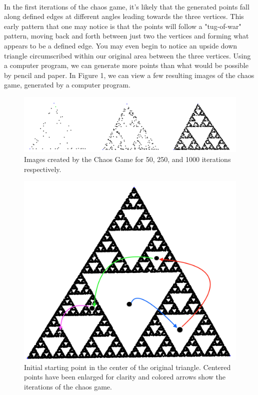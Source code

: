 \documentclass{article}
\begin{document}
\paragraph{}
In the first iterations of the chaos game, it's likely that the generated points fall along defined edges at different angles leading towards the three vertices. This early pattern that one may notice is that the points will follow a "tug-of-war" pattern, moving back and forth between just two the vertices and forming what appears to be a defined edge. You may even begin to notice an upside down triangle circumscribed within our original area between the three vertices. Using a computer program, we can generate more points than what would be possible by pencil and paper. In Figure 1, we can view a few resulting images of the chaos game, generated by a computer program.
\begin{figure}[H]
    \includegraphics[width=\linewidth, height=.2\textheight]{combined_image}
    \caption{Images created by the Chaos Game for 50, 250, and 1000 iterations respectively.}
\end{figure}
\begin{figure}[H]
    \centering
    \includegraphics[width=.5\linewidth, height=.25\textheight]{centered_start}
    \caption{Initial starting point in the center of the original triangle. Centered points have been enlarged for clarity and colored arrows show the iterations of the chaos game.}
\end{figure}
\end{document}
